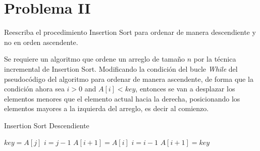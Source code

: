 \section{Problema II}
Reescriba el procedimiento Insertion Sort para ordenar de manera descendiente y no en orden ascendente.

Se requiere un algoritmo que ordene un arreglo de tamaño $n$ por la técnica incremental de Insertion Sort. Modificando la condición del bucle \textit{While} del pseudocódigo del algoritmo para ordenar de manera ascendente, de forma que la condición ahora sea $i > 0$ and $A[i] < key$, entonces se van a desplazar los elementos menores que el elemento actual hacia la derecha, posicionando los elementos mayores a la izquierda del arreglo, es decir al comienzo.

\begin{algorithm}[H]
    \caption{Insertion Sort Descendiente}\label{alg:isort_desc}
    \begin{algorithmic}[1]
                \State $key = A[j]$
                \State $i = j-1$
                    \State $A[i+1] = A[i]$
                    \State $i = i-1$
                \EndWhile\label{isort_while}
                \State $A[i+1] = key$
            \EndFor\label{isort_for}
        \EndProcedure
    \end{algorithmic}
\end{algorithm}